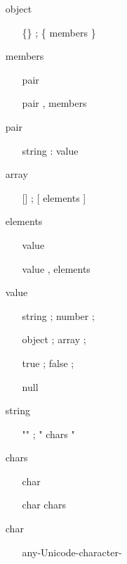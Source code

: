 \documentclass[11pt,twoside,a4paper]{article}
\begin{document}
\begin{minipage}[h]{0.70\textwidth}
\end{minipage} \hfill \begin{minipage}[h]{0.30\textwidth}
	\footnotesize
	\begin{itemize}
		\item[] object
		\begin{itemize}
			\item[] \{\} ; \{ members \}
		\end{itemize} 
		\item[] members
		\begin{itemize}
			\item[] pair
			\item[] pair , members
		\end{itemize}
		\item[] pair
		\begin{itemize}
			\item[] string : value
		\end{itemize}
		\item[] array
		\begin{itemize}
			\item[] [] ; [ elements ]
		\end{itemize}
		\item[] elements
		\begin{itemize}
			\item[] value
			\item[] value , elements
		\end{itemize}
		\item[] value
		\begin{itemize}
			\item[] string ; number ; 
			\item[] object ; array ;
			\item[] true ; false ;
			\item[] null
		\end{itemize}
		\item[] string
		\begin{itemize}
			\item[] "" ; " chars "
		\end{itemize}
		\item[] chars
		\begin{itemize}
			\item[] char
			\item[] char chars
		\end{itemize}
		\item[] char
		\begin{itemize}
			\item[] any-Unicode-character-

\end{itemize}
\end{itemize}
\end{minipage}
\end{document}
